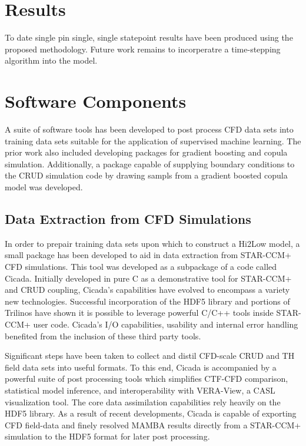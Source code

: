 \section{Results}

To date single pin single, single statepoint results have been produced using the proposed methodology.  Future work remains to incorperatre a time-stepping algorithm into the model. 


\section{Software Components}

A suite of software tools has been developed to post process CFD data sets into training data sets suitable for the application of supervised machine learning.   The prior work also included developing packages for gradient boosting and copula simulation.  Additionally, a package capable of supplying boundary conditions to the CRUD simulation code by drawing sampls from a gradient boosted copula model was developed.

\subsection{Data Extraction from CFD Simulations}

In order to prepair training data sets upon which to construct a Hi2Low model, a small package has been developed to aid in data extraction from STAR-CCM+ CFD simulations.  This tool was developed as a subpackage of a code called Cicada. Initially developed in pure C as a demonstrative tool for STAR-CCM+ and CRUD coupling, Cicada's capabilities have evolved to encompass a variety new technologies.  Successful incorporation of the HDF5 library and portions of Trilinos have shown it is possible to leverage powerful C/C++ tools inside STAR-CCM+ user code.  Cicada's I/O capabilities, usability and internal error handling benefited from the inclusion of these third party tools.

Significant steps have been taken to collect and distil CFD-scale CRUD and TH field data sets into useful formats.  To this end, Cicada is accompanied by a powerful suite of post processing tools which simplifies CTF-CFD comparison, statistical model inference, and interoperability with VERA-View, a CASL visualization tool. The core data assimilation capabilities rely heavily on the HDF5 library.  As a result of recent developments, Cicada is capable of exporting CFD field-data and finely resolved MAMBA results directly from a STAR-CCM+ simulation to the HDF5 format for later post processing.  

